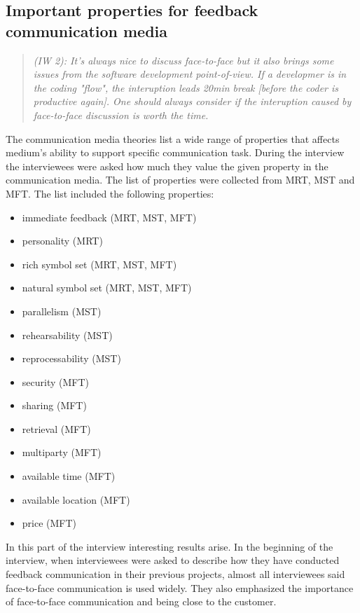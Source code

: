 \documentclass[english,12pt,a4paper,pdftex]{article}
\newcommand{\q}[2]{
\begin{quote}
\emph{(IW #1): #2}
\end{quote}}
\begin{document}
\subsection{Important properties for feedback communication media}

\q{2}{It's always nice to discuss face-to-face but it also brings some issues from the software development point-of-view. If a developmer is in the coding "flow", the interuption leads 20min break [before the coder is productive again]. One should always consider if the interuption caused by face-to-face discussion is worth the time.}

The communication media theories list a wide range of properties that affects medium's ability to support specific communication task. During the interview the interviewees were asked how much they value the given property in the communication media. The list of properties were collected from \ac{MRT}, \ac{MST} and \ac{MFT}. The list included the following properties:

\begin{itemize}
  \item immediate feedback (\acs{MRT}, \acs{MST}, \acs{MFT})
  \item personality (\acs{MRT})
  \item rich symbol set (\acs{MRT}, \acs{MST}, \acs{MFT})
  \item natural symbol set (\acs{MRT}, \acs{MST}, \acs{MFT})
  \item parallelism (\acs{MST})
  \item rehearsability (\acs{MST})
  \item reprocessability (\acs{MST})
  \item security (\acs{MFT})
  \item sharing (\acs{MFT})
  \item retrieval (\acs{MFT})
  \item multiparty (\acs{MFT})
  \item available time (\acs{MFT})
  \item available location (\acs{MFT})
  \item price (\acs{MFT})
\end{itemize}

In this part of the interview interesting results arise. In the beginning of the interview, when interviewees were asked to describe how they have conducted feedback communication in their previous projects, almost all interviewees said face-to-face communication is used widely. They also emphasized the importance of face-to-face communication and being close to the customer. 
\end{document}
